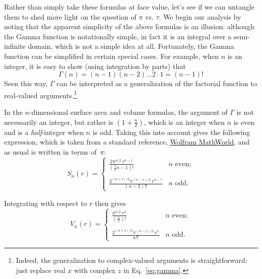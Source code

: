 Rather than simply take these formulas at face value, let's see if we can untangle them to shed more light on the question of $\pi$ vs. $\tau$. We begin our analysis by noting that the apparent simplicity of the above formulas is an illusion: although the Gamma function is notationally simple, in fact it is an integral over a semi-infinite domain, which is not a simple idea at all. Fortunately, the Gamma function can be simplified in certain special cases. For example, when $n$ is an integer, it is easy to show (using integration by parts) that
\[
\Gamma(n) = (n-1)(n-2)\ldots 2\cdot 1 = (n-1)!
\]
Seen this way, $\Gamma$ can be interpreted as a generalization of the factorial function to real-valued arguments.\footnote{Indeed, the generalization to complex-valued arguments is straightforward: just replace real $x$ with complex $z$ in Eq.~\eqref{eq:gamma}.}

In the $n$-dimensional surface area and volume formulas, the argument of $\Gamma$ is not necessarily an integer, but rather is $\left(1 + \frac{n}{2}\right)$, which is an integer when $n$ is even and is a \emph{half}-integer when $n$ is odd. Taking this into account gives the following expression, which is taken from a standard reference, \href{https://mathworld.wolfram.com/Hypersphere.html}{Wolfram MathWorld}, and as usual is written in terms of~$\pi$:
\begin{equation}
\label{eq:surface_area_mathworld}
S_n(r) = \begin{cases}
\displaystyle \frac{2\pi^{n/2}\,r^{n-1}}{(\frac{1}{2}n - 1)!} & n \text{ even}; \\ \\
 \displaystyle \frac{2^{(n+1)/2}\pi^{(n-1)/2}\,r^{n-1}}{(n-2)!!} & n \text{ odd}.
\end{cases}
\end{equation}

Integrating with respect to $r$ then gives
\begin{equation}
\label{eq:volume_mathworld}
V_n(r) = \begin{cases}
\displaystyle \frac{\pi^{n/2}\,r^n}{(\frac{n}{2})!} & n \text{ even}; \\ \\
\displaystyle \frac{2^{(n+1)/2}\pi^{(n-1)/2}\,r^n}{n!!} & n \text{ odd}.
\end{cases}
\end{equation}

